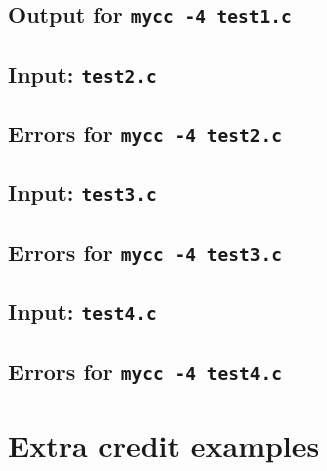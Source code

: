 \documentclass{article}
\newcommand{\typecheck}{4}
\begin{document}
\subsection{Output for {\tt mycc -\typecheck{} test1.c}}



\subsection{Input: {\tt test2.c}}



\subsection{Errors for {\tt mycc -\typecheck{} test2.c}}



\subsection{Input: {\tt test3.c}}



\subsection{Errors for {\tt mycc -\typecheck{} test3.c}}



\subsection{Input: {\tt test4.c}}



\subsection{Errors for {\tt mycc -\typecheck{} test4.c}}



\section{Extra credit examples} \label{SEC:exmax}
\end{document}
